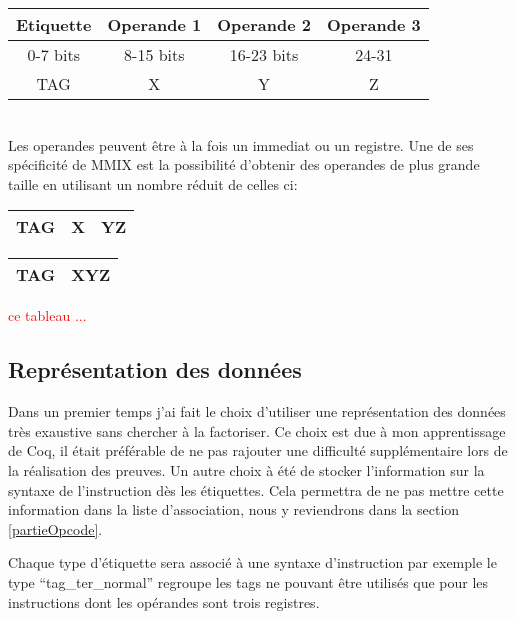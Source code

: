 \documentclass {article}
\newcommand{\codefrom}[3]
           {}
\theoremstyle{definition}
\theoremstyle{remark}
\newcommand{\todo}[1]{\textcolor{red}{#1}}
\begin{document}
\begin{tabular}{|c|c|c|c|}
  \hline
  Etiquette & Operande 1 & Operande 2 & Operande 3\\
  \hline
  0-7 bits & 8-15 bits & 16-23 bits & 24-31  \\
  \hline
  TAG & X & Y & Z \\
  \hline
\end{tabular}
\\
Les operandes peuvent être à la fois un immediat ou un registre.
Une de ses spécificité de MMIX est la possibilité d'obtenir des operandes
de plus grande taille en utilisant un nombre réduit de celles ci:\\

\begin{tabular}{|c|c|c|}
  \hline 
  TAG & X & YZ \\
  \hline
\end{tabular}
\begin{tabular}{|c|c|}
  \hline 
  TAG & XYZ \\
  \hline
\end{tabular}

\todo{ce tableau ...}



\subsection{Représentation des données}
\label{representation des donnees}

Dans un premier temps j'ai fait le choix d'utiliser une représentation des données très exaustive sans
chercher à la factoriser. Ce choix est due à mon apprentissage de Coq, il était préférable de ne pas
rajouter une difficulté supplémentaire lors de la réalisation des preuves.
Un autre choix à été de stocker l'information sur la syntaxe de l'instruction dès les étiquettes.
Cela permettra de ne pas mettre cette information dans la liste d'association, nous y reviendrons dans la
section \ref{partieOpcode}.

\codefrom{src}{ast_instructions}{tag}

Chaque type d'étiquette sera associé à une syntaxe d'instruction par exemple le type ``tag\_ter\_normal''
regroupe les tags ne pouvant être utilisés que pour les instructions dont les opérandes sont trois registres.
\end{document}
